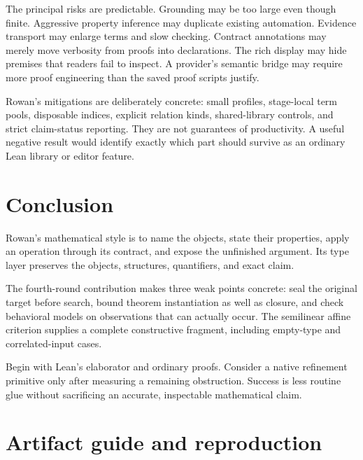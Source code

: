 \documentclass[11pt,letterpaper]{article}
\theoremstyle{definition}\newtheorem{definition}[theorem]{Definition}
\theoremstyle{remark}\newtheorem{remark}[theorem]{Remark}
\begin{document}
The principal risks are predictable. Grounding may be too large even though
finite. Aggressive property inference may duplicate existing automation.
Evidence transport may enlarge terms and slow checking. Contract annotations
may merely move verbosity from proofs into declarations. The rich display
may hide premises that readers fail to inspect. A provider's semantic bridge
may require more proof engineering than the saved proof scripts justify.

Rowan's mitigations are deliberately concrete: small profiles, stage-local
term pools, disposable indices, explicit relation kinds, shared-library
controls, and strict claim-status reporting. They are not guarantees of
productivity. A useful negative result would identify exactly which part
should survive as an ordinary Lean library or editor feature.

\section{Conclusion}

Rowan's mathematical style is to name the objects, state their properties,
apply an operation through its contract, and expose the unfinished argument.
Its type layer preserves the objects, structures, quantifiers, and exact claim.

The fourth-round contribution makes three weak points concrete: seal the
original target before search, bound theorem instantiation as well as closure,
and check behavioral models on observations that can actually occur. The
semilinear affine criterion supplies a complete constructive fragment,
including empty-type and correlated-input cases.

Begin with Lean's elaborator and ordinary proofs. Consider a native refinement
primitive only after measuring a remaining obstruction. Success is less routine
glue without sacrificing an accurate, inspectable mathematical claim.

\clearpage
\appendix
\section{Artifact guide and reproduction}
\end{document}
